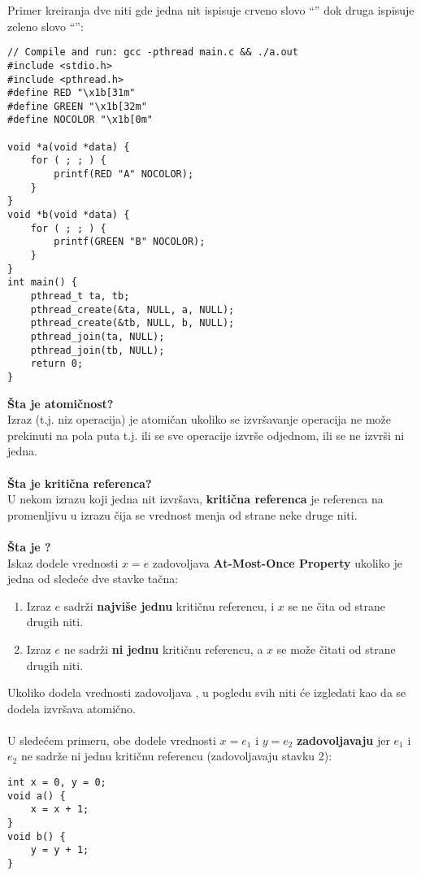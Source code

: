 Primer kreiranja dve  niti gde jedna nit ispisuje crveno slovo ``'' dok druga ispisuje zeleno slovo ``'':
\begin{lstlisting}
// Compile and run: gcc -pthread main.c && ./a.out
#include <stdio.h>
#include <pthread.h>
#define RED "\x1b[31m"
#define GREEN "\x1b[32m"
#define NOCOLOR "\x1b[0m"

void *a(void *data) {
	for ( ; ; ) {
		printf(RED "A" NOCOLOR);
	}
}
void *b(void *data) {
	for ( ; ; ) {
		printf(GREEN "B" NOCOLOR);
	}
}
int main() {
	pthread_t ta, tb;
	pthread_create(&ta, NULL, a, NULL);
	pthread_create(&tb, NULL, b, NULL);	
	pthread_join(ta, NULL);
	pthread_join(tb, NULL);
	return 0;
}
\end{lstlisting}
\textbf{\v{S}ta je atomi\v{c}nost?}\\
Izraz (t.j. niz operacija) je atomi\v{c}an ukoliko se izvr\v{s}avanje operacija ne mo\v{z}e prekinuti na pola puta t.j. ili se sve operacije izvr\v{s}e odjednom, ili se ne izvr\v{s}i ni jedna.
\\\\
\textbf{\v{S}ta je kriti\v{c}na referenca?}\\
U nekom izrazu koji jedna nit izvr\v{s}ava, \textbf{kriti\v{c}na referenca} je referenca na promenljivu u izrazu \v{c}ija se vrednost menja od strane neke druge niti.
\\\\
\textbf{\v{S}ta je ?}\\
Iskaz dodele vrednosti $x=e$ zadovoljava \textbf{\latin At-Most-Once Property} ukoliko je jedna od slede\'{c}e dve stavke ta\v{c}na:
\begin{enumerate}
    \item Izraz $e$ sadr\v{z}i \textbf{najvi\v{s}e jednu} kriti\v{c}nu referencu, i $x$ se ne \v{c}ita od strane drugih niti.
    \item Izraz $e$ ne sadr\v{z}i \textbf{ni jednu} kriti\v{c}nu referencu, a $x$ se mo\v{z}e \v{c}itati od strane drugih niti. 
\end{enumerate}
Ukoliko dodela vrednosti zadovoljava , u pogledu svih niti \'{c}e izgledati kao da se dodela izvr\v{s}ava atomi\v{c}no.
\\\\
U slede\'{c}em primeru, obe dodele vrednosti $x=e_1$ i $y=e_2$ \textbf{zadovoljavaju}  jer $e_1$ i $e_2$ ne sadr\v{z}e ni jednu kriti\v{c}nu referencu (zadovoljavaju stavku 2):
\begin{lstlisting}
int x = 0, y = 0;
void a() {
    x = x + 1;
}
void b() {
    y = y + 1;
}
\end{lstlisting}
